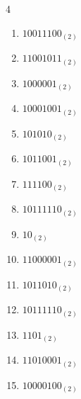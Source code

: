 \begin{multicols}{4}
\begin{enumerate}
        \phantom{$=59$}

  \item $10011100_{(2)}$

        \phantom{$=156$}

\columnbreak %

\resetques

  \item $11001011_{(2)}$

        \phantom{$=203$}

  \item $1000001_{(2)}$

        \phantom{$=65$}

  \item $10001001_{(2)}$

        \phantom{$=137$}

  \item $101010_{(2)}$

        \phantom{$=42$}

  \item $1011001_{(2)}$

        \phantom{$=89$}

  \item $111100_{(2)}$

        \phantom{$=60$}

  \item $10111110_{(2)}$

        \phantom{$=190$}

  \item $10_{(2)}$

        \phantom{$=2$}

  \item $11000001_{(2)}$

        \phantom{$=193$}

  \item $1011010_{(2)}$

        \phantom{$=90$}

  \item $10111110_{(2)}$

        \phantom{$=190$}

  \item $1101_{(2)}$

        \phantom{$=13$}

  \item $11010001_{(2)}$

        \phantom{$=209$}

  \item $10000100_{(2)}$


\end{enumerate}
\end{multicols}
